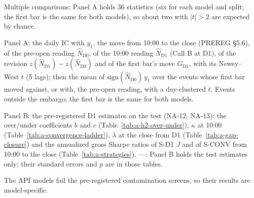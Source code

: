 \begin{table}[htbp]
\begin{threeparttable}
\begin{tablenotes}[flushleft]
\item Multiple comparisons: Panel A holds 36 statistics (six for each model and split; the first bar is the same for both models), so about two with $|t| > 2$ are expected by chance.
\item Panel A: the daily IC with $y_1$, the move from 10:00 to the close (PREREG \S5.6), of the pre-open reading $\hat N_{\mathrm{D0}}$, of the 10:00 reading $\hat N_{\mathrm{D1}}$ (Call B at D1), of the revision $z(\hat N_{\mathrm{D1}}) - z(\hat N_{\mathrm{D0}})$ and of the first bar's move $G_{\mathrm{D1}}$, with its Newey--West $t$ (5 lags); then the mean of $\mathrm{sign}(\hat N_{\mathrm{D0}})\,y_1$ over the events whose first bar moved against, or with, the pre-open reading, with a day-clustered $t$. Events outside the embargo; the first bar is the same for both models.
\item Panel B: the pre-registered D1 estimates on the test (NA-12, NA-13): the over/under coefficients $b$ and $c$ (Table~\ref{tab:a-h2-over-under}), $\kappa$ at 10:00 (Table~\ref{tab:a-convergence-ladder}), $\lambda$ at the close from D1 (Table~\ref{tab:a-gap-closure}) and the annualized gross Sharpe ratios of S-D1 $J$ and of S-CONV from 10:00 to the close (Table~\ref{tab:a-strategies}). ---: Panel B holds the test estimates only; their standard errors and $p$ are in those tables.
\item The API models fail the pre-registered contamination screens, so their results are model-specific.
\end{tablenotes}
\end{threeparttable}
\end{table}

